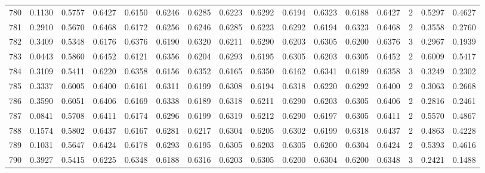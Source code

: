 \begin{tabular}{lrrrrrrrrrrrrrrr}
780 &      0.1130 &  0.5757 &  0.6427 &  0.6150 &  0.6246 &  0.6285 &  0.6223 &  0.6292 &  0.6194 &  0.6323 &   0.6188 &     0.6427 &      2 &                    0.5297 &                     0.4627 \\
781 &      0.2910 &  0.5670 &  0.6468 &  0.6172 &  0.6256 &  0.6246 &  0.6285 &  0.6223 &  0.6292 &  0.6194 &   0.6323 &     0.6468 &      2 &                    0.3558 &                     0.2760 \\
782 &      0.3409 &  0.5348 &  0.6176 &  0.6376 &  0.6190 &  0.6320 &  0.6211 &  0.6290 &  0.6203 &  0.6305 &   0.6200 &     0.6376 &      3 &                    0.2967 &                     0.1939 \\
783 &      0.0443 &  0.5860 &  0.6452 &  0.6121 &  0.6356 &  0.6204 &  0.6293 &  0.6195 &  0.6305 &  0.6203 &   0.6305 &     0.6452 &      2 &                    0.6009 &                     0.5417 \\
784 &      0.3109 &  0.5411 &  0.6220 &  0.6358 &  0.6156 &  0.6352 &  0.6165 &  0.6350 &  0.6162 &  0.6341 &   0.6189 &     0.6358 &      3 &                    0.3249 &                     0.2302 \\
785 &      0.3337 &  0.6005 &  0.6400 &  0.6161 &  0.6311 &  0.6199 &  0.6308 &  0.6194 &  0.6318 &  0.6220 &   0.6292 &     0.6400 &      2 &                    0.3063 &                     0.2668 \\
786 &      0.3590 &  0.6051 &  0.6406 &  0.6169 &  0.6338 &  0.6189 &  0.6318 &  0.6211 &  0.6290 &  0.6203 &   0.6305 &     0.6406 &      2 &                    0.2816 &                     0.2461 \\
787 &      0.0841 &  0.5708 &  0.6411 &  0.6174 &  0.6296 &  0.6199 &  0.6319 &  0.6212 &  0.6290 &  0.6197 &   0.6305 &     0.6411 &      2 &                    0.5570 &                     0.4867 \\
788 &      0.1574 &  0.5802 &  0.6437 &  0.6167 &  0.6281 &  0.6217 &  0.6304 &  0.6205 &  0.6302 &  0.6199 &   0.6318 &     0.6437 &      2 &                    0.4863 &                     0.4228 \\
789 &      0.1031 &  0.5647 &  0.6424 &  0.6178 &  0.6293 &  0.6195 &  0.6305 &  0.6203 &  0.6305 &  0.6200 &   0.6304 &     0.6424 &      2 &                    0.5393 &                     0.4616 \\
790 &      0.3927 &  0.5415 &  0.6225 &  0.6348 &  0.6188 &  0.6316 &  0.6203 &  0.6305 &  0.6200 &  0.6304 &   0.6200 &     0.6348 &      3 &                    0.2421 &                     0.1488 \\

\end{tabular}

